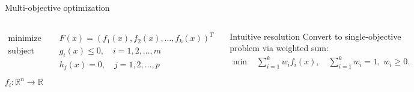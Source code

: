 \documentclass[aspectratio=169,xcolor=dvipsnames]{beamer}
\begin{document}
\begin{frame}{Multi-objective optimization}
    \begin{columns}[c]
        \begin{equation*}
            \begin{aligned}
                \text{minimize }   & \quad F(x) = (f_1(x), f_2(x), \dots, f_k(x))^T \\
                \text{subject to } & \quad g_i(x) \leq 0, \quad i = 1, 2, \dots, m  \\
                                   & \quad h_j(x) = 0, \quad j = 1, 2, \dots, p     \\
            \end{aligned}
        \end{equation*}
        $f_i: \mathbb{R}^n \rightarrow \mathbb{R}$

        \vspace{1em}
        \begin{block}{Intuitive resolution}
            Convert to single-objective problem via weighted sum:
            \vspace{-.85em}
            \begin{align*}
                \text{min } & \sum_{i=1}^k w_i f_i(x), \quad \sum_{i=1}^k w_i = 1, \; w_i \geq 0.
            \end{align*}
        \end{block}



        \begin{figure}
            \centering
            \includegraphics[width=1\linewidth]{imgs/objective-space.pdf}
            \caption{Different spaces in multi-objective optimization.}
        \end{figure}

        Objective space: $F(x) = z = (z_1, z_2,\dots,z_k)^T$, where $z_i = f_i$.

    \end{columns}
\end{frame}
\end{document}
